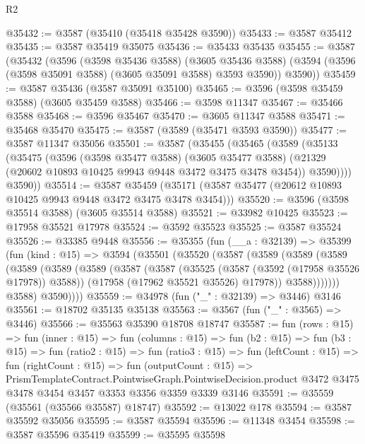 \begin{lexlean}{R2}
\begin{coremodule}
@35432 := @3587 (@35410 (@35418 @35428 @3590))
@35433 := @3587 @35412
@35435 := @3587 @35419 @35075
@35436 := @35433 @35435
@35455 := @3587
    (@35432
      (@3596
        (@3598 @35436 @3588)
        (@3605 @35436 @3588)
        (@3594 (@3596 (@3598 @35091 @3588) (@3605 @35091 @3588) @3593 @3590))
        @3590))
@35459 := @3587 @35436 (@3587 @35091 @35100)
@35465 := @3596 (@3598 @35459 @3588) (@3605 @35459 @3588)
@35466 := @3598 @11347
@35467 := @35466 @3588
@35468 := @3596 @35467
@35470 := @3605 @11347 @3588
@35471 := @35468 @35470
@35475 := @3587 (@3589 (@35471 @3593 @3590))
@35477 := @3587 @11347 @35056
@35501 := @3587
    (@35455
      (@35465
        (@3589
          (@35133
            (@35475
              (@3596
                (@3598 @35477 @3588)
                (@3605 @35477 @3588)
                (@21329 (@20602 @10893 @10425 @9943 @9448 @3472 @3475 @3478 @3454))
                @3590))))
        @3590))
@35514 := @3587
    @35459
    (@35171 (@3587 @35477 (@20612 @10893 @10425 @9943 @9448 @3472 @3475 @3478 @3454)))
@35520 := @3596 (@3598 @35514 @3588) (@3605 @35514 @3588)
@35521 := @33982 @10425
@35523 := @17958 @35521 @17978
@35524 := @3592 @35523
@35525 := @3587 @35524
@35526 := @33385 @9448
@35556 := @35355
    (fun (__a : @32139) =>
    @35399
      (fun (kind : @15) =>
      @3594
        (@35501
          (@35520
            (@3587
              (@3589
                (@3589
                  (@3589
                    (@3589
                      (@3589
                        (@3589
                          (@3587
                            (@3587
                              (@35525 (@3587 (@3592 (@17958 @35526 @17978)) @3588))
                              (@17958 (@17962 @35521 @35526) @17978))
                            @3588)))))))
              @3588)
            @3590))))
@35559 := @34978 (fun ("_" : @32139) => @3446) @3146
@35561 := @18702 @35135 @35138
@35563 := @3567 (fun ("_" : @3565) => @3446)
@35566 := @35563 @35390 @18708 @18747
@35587 := fun (rows : @15) =>
  fun (inner : @15) =>
  fun (columns : @15) =>
  fun (b2 : @15) =>
  fun (b3 : @15) =>
  fun (ratio2 : @15) =>
  fun (ratio3 : @15) =>
  fun (leftCount : @15) =>
  fun (rightCount : @15) =>
  fun (outputCount : @15) =>
  PrismTemplateContract.PointwiseGraph.PointwiseDecision.product
    @3472
    @3475
    @3478
    @3454
    @3457
    @3353
    @3356
    @3359
    @3339
    @3146
@35591 := @35559 (@35561 (@35566 @35587) @18747)
@35592 := @13022 @178
@35594 := @3587 @35592 @35056
@35595 := @3587 @35594
@35596 := @11348 @3454
@35598 := @3587 @35596 @35419
@35599 := @35595 @35598

\end{coremodule}
\end{lexlean}
